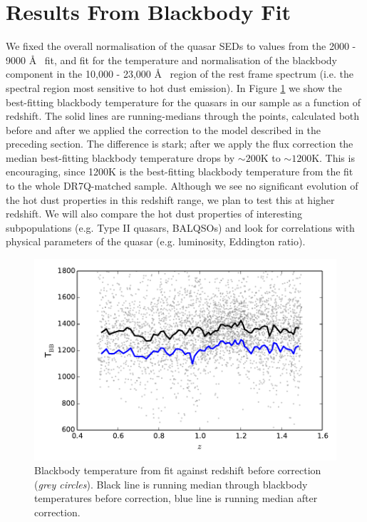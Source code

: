 \section{Results From Blackbody Fit}

We fixed the overall normalisation of the quasar SEDs to values from the 2000 - 9000 \AA~ fit, and fit for the temperature and normalisation of the blackbody component in the 10,000 - 23,000 \AA~ region of the rest frame spectrum (i.e. the spectral region most sensitive to hot dust emission). In Figure \ref{fig:bbtvz} we show the best-fitting blackbody temperature for the quasars in our sample as a function of redshift. The solid lines are running-medians through the points, calculated both before and after we applied the correction to the model described in the preceding section. The difference is stark; after we apply the flux correction the median best-fitting blackbody temperature drops by $\sim 200$K to $\sim 1200$K. This is encouraging, since 1200K is the best-fitting blackbody temperature from the fit to the whole DR7Q-matched sample. Although we see no significant evolution of the hot dust properties in this redshift range, we plan to test this at higher redshift. We will also compare the hot dust properties of interesting subpopulations (e.g. Type II quasars, BALQSOs) and look for correlations with physical parameters of the quasar (e.g. luminosity, Eddington ratio). 

\begin{figure}
  \centering
  \includegraphics[width=\textwidth]{figures/chapter06/bbt_z.pdf}
  \caption{Blackbody temperature from fit against redshift before correction ({\it grey circles}). Black line is running median through blackbody temperatures before correction, blue line is running median after correction.}
  \label{fig:bbtvz}
\end{figure}

